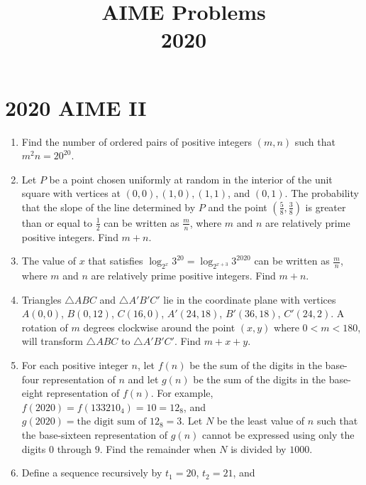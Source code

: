 \documentclass{article}
\title{AIME Problems \\ 2020}
\date{}
\begin{document}
\maketitle\thispagestyle{fancy}\newpage\section*{2020 AIME II}\begin{enumerate}[label=\arabic*., itemsep=0.5em]\item Find the number of ordered pairs of positive integers \((m,n)\) such that \({m^2n = 20 ^{20}}\).\par \vspace{0.5em}\item Let \(P\) be a point chosen uniformly at random in the interior of the unit square with vertices at \((0,0), (1,0), (1,1)\), and \((0,1)\). The probability that the slope of the line determined by \(P\) and the point \(\left(\frac58, \frac38 \right)\) is greater than or equal to \(\frac12\) can be written as \(\frac{m}{n}\), where \(m\) and \(n\) are relatively prime positive integers. Find \(m+n\).\par \vspace{0.5em}\item The value of \(x\) that satisfies \(\log_{2^x} 3^{20} = \log_{2^{x+3}} 3^{2020}\) can be written as \(\frac{m}{n}\), where \(m\) and \(n\) are relatively prime positive integers. Find \(m+n\).\par \vspace{0.5em}\item Triangles \(\triangle ABC\) and \(\triangle A'B'C'\) lie in the coordinate plane with vertices \(A(0,0)\), \(B(0,12)\), \(C(16,0)\), \(A'(24,18)\), \(B'(36,18)\), \(C'(24,2)\). A rotation of \(m\) degrees clockwise around the point \((x,y)\) where \(0<m<180\), will transform \(\triangle ABC\) to \(\triangle A'B'C'\). Find \(m+x+y\).\par \vspace{0.5em}\item For each positive integer \(n\), let \(f(n)\) be the sum of the digits in the base-four representation of \(n\) and let \(g(n)\) be the sum of the digits in the base-eight representation of \(f(n)\). For example, \(f(2020) = f(133210_{\text{4}}) = 10 = 12_{\text{8}}\), and \(g(2020) = \text{the digit sum of }12_{\text{8}} = 3\). Let \(N\) be the least value of \(n\) such that the base-sixteen representation of \(g(n)\) cannot be expressed using only the digits \(0\) through \(9\). Find the remainder when \(N\) is divided by \(1000\).\par \vspace{0.5em}\item Define a sequence recursively by \(t_1 = 20\), \(t_2 = 21\), and

\end{enumerate}
\end{document}
